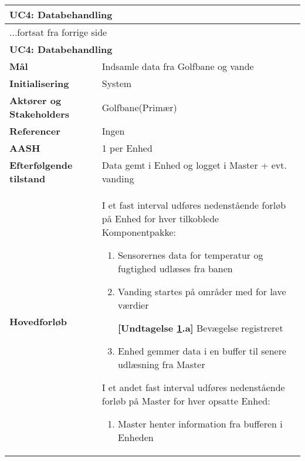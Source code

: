 \begin{center} \centering \label{UC4}
	\begin{longtable}{|p{5cm}|p{9cm}|}  %
	\hline
		\multicolumn{2}{|l|}{\textbf{UC4: Databehandling}} \\\hline %
		\endfirsthead
		
		\multicolumn{2}{l}{...fortsat fra forrige side} \\ \hline %
		\multicolumn{2}{|l|}{\textbf{UC4: Databehandling}} \\\hline %
		\endhead	
		
		\textbf{Mål}								&Indsamle data fra Golfbane og vande		\\\hline
		\textbf{Initialisering}					&System				\\\hline
		\textbf{Aktører og Stakeholders}			&Golfbane(Primær)	\\\hline
		\textbf{Referencer}						&Ingen				\\\hline
		\textbf{AASH}							&1 per Enhed			\\\hline
		\textbf{Efterfølgende tilstand}			&Data gemt i Enhed og logget i Master + evt. vanding 	\\\hline
		\textbf{Hovedforløb}						
		
		&I et fast interval udføres nedenstående forløb på Enhed for hver tilkoblede Komponentpakke:
			\begin{enumerate}
			
				\item Sensorernes data for temperatur og fugtighed udlæses fra banen
				
				\item \label{uc4vandstart} Vanding startes på områder med for lave værdier
				
					\textbf{[Undtagelse \ref{uc4vandstart}.a]} Bevægelse registreret 				
				
				\item Enhed gemmer data i en buffer til senere udlæsning fra Master				
			
			\end{enumerate}
			
			I et andet fast interval udføres nedenstående forløb på Master for hver opsatte Enhed:
			\begin{enumerate}[resume]
			
				\item Master henter information fra bufferen i Enheden
				

\end{enumerate}
\end{longtable}
\end{center}
